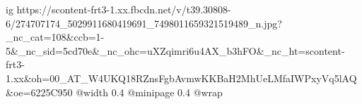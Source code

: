  
 
 
 
 

\ifcmt
  ig https://scontent-frt3-1.xx.fbcdn.net/v/t39.30808-6/274707174_5029911680419691_7498011659321519489_n.jpg?_nc_cat=108&ccb=1-5&_nc_sid=5cd70e&_nc_ohc=uXZqimri6u4AX_b3hFO&_nc_ht=scontent-frt3-1.xx&oh=00_AT_W4UKQ18RZnsFgbAvmwKKBaH2MhUeLMfaIWPxyVq5lAQ&oe=6225C950
  @width 0.4
  @minipage 0.4
  @wrap \parpic[r]
\fi
